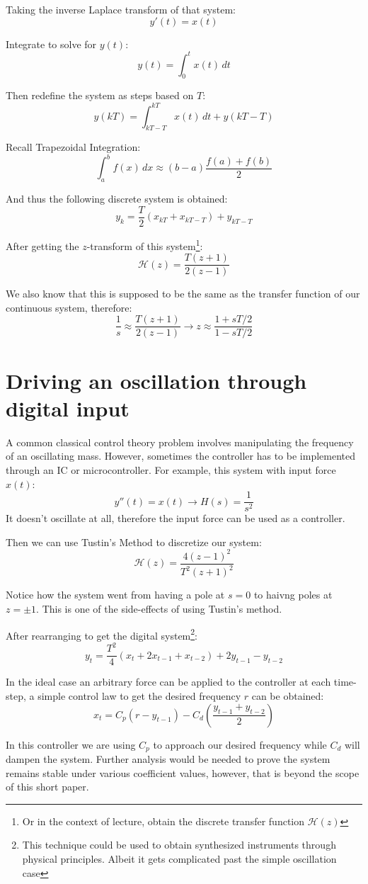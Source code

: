 \documentclass{article}
\newcommand{\transf}[1]{\mathcal H(#1)}
\begin{document}
Taking the inverse Laplace transform of that system:
$$
	y'(t) = x(t)
$$

Integrate to solve for $y(t)$:
$$
	y(t) = \int_0^t{x(t) \, dt}
$$

Then redefine the system as steps based on $T$:
$$
	y(kT) = \int_{kT-T}^{kT}{x(t) \, dt} + y(kT - T)
$$

Recall Trapezoidal Integration:
$$
	\int_a^b{f(x) \, dx} \approx (b - a)\frac{f(a) + f(b)}{2}
$$

And thus the following discrete system is obtained:
$$
	y_k = \frac{T}{2}(x_{kT} + x_{kT - T}) + y_{kT - T}
$$

After getting the $z$-transform of this system\footnote{Or in the context of
	lecture, obtain the discrete transfer function $\mathcal H(z)$}:
$$
	\transf{z} = \frac{T (z + 1)}{2 (z - 1)}
$$

We also know that this is supposed to be the same as the transfer function
of our continuous system, therefore:
$$
	\frac{1}{s} \approx \frac{T (z + 1)}{2 (z - 1)} \rightarrow z \approx \frac{1 + sT/2}{1 - sT/2}
$$

\section{Driving an oscillation through digital input}
A common classical control theory problem involves manipulating the frequency of
an oscillating mass. However, sometimes the controller has to be implemented through
an IC or microcontroller. For example, this system with input force $x(t)$:
$$
	y''(t) = x(t) \rightarrow H(s) = \frac{1}{s^2}
$$
It doesn't oscillate at all, therefore the input force can be used as a controller.

Then we can use Tustin's Method to discretize our system:
$$
	\transf{z} = \frac{4(z - 1)^2}{T^2(z + 1)^2}
$$

Notice how the system went from having a pole at $s = 0$ to haivng poles at
$z = \pm 1$. This is one of the side-effects of using Tustin's method.

After rearranging to get the digital system\footnote{This technique could be used
	to obtain synthesized instruments through physical principles. Albeit it gets
	complicated past the simple oscillation case}:
$$
	y_t = \frac{T^2}{4}(x_t + 2x_{t-1} + x_{t-2}) + 2y_{t-1} - y_{t-2}
$$

In the ideal case an arbitrary force can be applied to the controller at each
time-step, a simple control law to get the desired frequency $r$ can be obtained:
$$
	x_t = C_p(r - y_{t-1}) - C_d(\frac{y_{t-1} + y_{t-2}}{2})
$$

In this controller we are using $C_p$ to approach our desired frequency while
$C_d$ will dampen the system. Further analysis would be needed to prove the
system remains stable under various coefficient values, however, that is
beyond the scope of this short paper.
\end{document}
